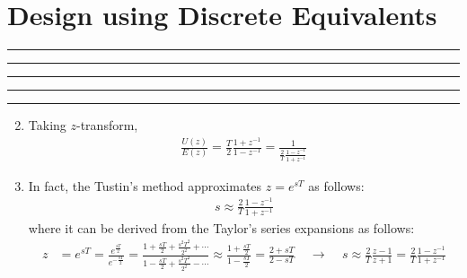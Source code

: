 \setcounter{chapter}{7}
\setcounter{section}{2}
\section{Design using Discrete Equivalents}
\vspace{-8pt} \hrule \hrule \hrule \hrule \hrule  \vspace{12pt}

\begin{enumerate}
	\setcounter{enumi}{1}
		\item Taking $z$-transform, 
		\begin{align*}
			\frac{U(z)}{E(z)} = \frac{T}{2} \frac{1+z^{-1}}{1-z^{-1}} = \frac{1}{\frac{2}{T} \frac{1-z^{-1}}{1+z^{-1}} }
		\end{align*}
		\item In fact, the Tustin's method approximates $z = e^{sT}$ as follows:
		\begin{align*}
			s \approx  \frac{2}{T} \frac{1-z^{-1}}{1+z^{-1}}
		\end{align*}
		where it can be derived from the Taylor's series expansions as follows:
		\begin{align*}
			z &= e^{sT} = \frac{e^{\frac{sT}{2}}}{e^{-\frac{sT}{2}}} 
			= \frac{1 + \frac{sT}{2} + \frac{s^2T^2}{2^2} + \cdots}{1 - \frac{sT}{2} + \frac{s^2T^2}{2^2} - \cdots} \approx  \frac{1 + \frac{sT}{2}}{1 - \frac{sT}{2}}  = \frac{2+sT}{2-sT} 
			~~~~~\rightarrow~~~~~ s \approx  \frac{2}{T} \frac{z-1}{z+1} = \frac{2}{T} \frac{1-z^{-1}}{1+z^{-1}}
		\end{align*}

\end{enumerate}